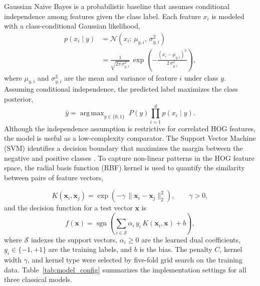 \documentclass{article}
\DeclareMathOperator*{\argmax}{arg\,max}
\DeclareMathOperator{\sgn}{sgn}
\begin{document}
Gaussian Naive Bayes is a probabilistic baseline that assumes conditional independence among features given the class label. Each feature $x_i$ is modeled with a class-conditional Gaussian likelihood,
\begin{equation}
\begin{split}
p(x_i \mid y) &= \mathcal{N}\!\left(x_i;\, \mu_{y,i},\, \sigma_{y,i}^{2}\right) \\
&= \frac{1}{\sqrt{2\pi\,\sigma_{y,i}^{2}}}\,
\exp\!\left(-\frac{(x_i - \mu_{y,i})^{2}}{2\,\sigma_{y,i}^{2}}\right),
\end{split}
\end{equation}
where $\mu_{y,i}$ and $\sigma_{y,i}^{2}$ are the mean and variance of feature $i$ under class $y$. Assuming conditional independence, the predicted label maximizes the class posterior,
\begin{equation}
\hat{y} = \argmax_{y \in \{0, 1\}} \; P(y) \prod_{i=1}^{d} p(x_i \mid y).
\end{equation}
Although the independence assumption is restrictive for correlated HOG features, the model is useful as a low-complexity comparator.
The Support Vector Machine (SVM) identifies a decision boundary that maximizes the margin between the negative and positive classes \cite{cortes1995svm}. To capture non-linear patterns in the HOG feature space, the radial basis function (RBF) kernel is used to quantify the similarity between pairs of feature vectors,

\begin{equation}
K(\mathbf{x}_i, \mathbf{x}_j) = \exp\!\left(-\gamma\, \lVert \mathbf{x}_i - \mathbf{x}_j \rVert_2^{2}\right), \qquad \gamma > 0,
\end{equation}
and the decision function for a test vector $\mathbf{x}$ is
\begin{equation}
f(\mathbf{x}) = \sgn\!\left(\sum_{i \in \mathcal{S}} \alpha_i\, y_i\, K(\mathbf{x}_i, \mathbf{x}) + b\right),
\end{equation}
where $\mathcal{S}$ indexes the support vectors, $\alpha_i \ge 0$ are the learned dual coefficients, $y_i \in \{-1, +1\}$ are the training labels, and $b$ is the bias. The penalty $C$, kernel width $\gamma$, and kernel type were selected by five-fold grid search on the training data. Table~\ref{tab:model_config} summarizes the implementation settings for all three classical models.
\end{document}

